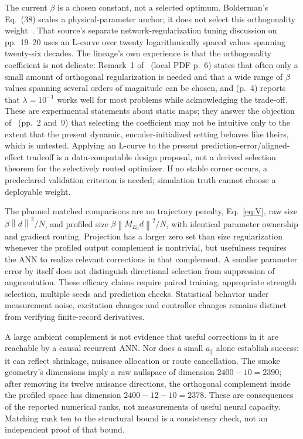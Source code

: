 \documentclass[11pt,a4paper]{article}
\newcommand{\norm}[1]{\left\lVert#1\right\rVert}
\theoremstyle{remark}
\begin{document}
The current $\beta$ is a chosen constant, not a selected optimum. Bolderman's Eq.~(38) scales a physical-parameter anchor; it does not select this orthogonality weight~\cite{bolderman2023}. That source's separate network-regularization tuning discussion on pp.~19--20 uses an L-curve over twenty logarithmically spaced values spanning twenty-six decades. The lineage's own experience is that the orthogonality coefficient is not delicate: Remark~1 of~\cite{gyorok2025} (local PDF p.~6) states that often only a small amount of orthogonal regularization is needed and that a wide range of $\beta$ values spanning several orders of magnitude can be chosen, and \cite{kon2023} (p.~4) reports that $\lambda=10^{-1}$ works well for most problems while acknowledging the trade-off. These are experimental statements about static maps; they answer the objection of~\cite{gyorok2026} (pp.~2 and~9) that selecting the coefficient may not be intuitive only to the extent that the present dynamic, encoder-initialized setting behaves like theirs, which is untested. Applying an L-curve to the present prediction-error/aligned-effect tradeoff is a data-computable design proposal, not a derived selection theorem for the selectively routed optimizer. If no stable corner occurs, a predeclared validation criterion is needed; simulation truth cannot choose a deployable weight.

The planned matched comparisons are no trajectory penalty, Eq.~\eqref{eq:V}, raw size $\beta\norm d^2/N$, and profiled size $\beta\norm{M_{E_0}d}^2/N$, with identical parameter ownership and gradient routing. Projection has a larger zero set than size regularization whenever the profiled output complement is nontrivial, but usefulness requires the ANN to realize relevant corrections in that complement. A smaller parameter error by itself does not distinguish directional selection from suppression of augmentation. These efficacy claims require paired training, appropriate strength selection, multiple seeds and prediction checks. Statistical behavior under measurement noise, excitation changes and controller changes remains distinct from verifying finite-record derivatives.

A large ambient complement is not evidence that useful corrections in it are reachable by a causal recurrent ANN. Nor does a small $a_\parallel$ alone establish success: it can reflect shrinkage, nuisance allocation or route cancellation. The smoke geometry's dimensions imply a raw nullspace of dimension $2400-10=2390$; after removing its twelve nuisance directions, the orthogonal complement inside the profiled space has dimension $2400-12-10=2378$. These are consequences of the reported numerical ranks, not measurements of useful neural capacity. Matching rank ten to the structural bound is a consistency check, not an independent proof of that bound.
\end{document}
